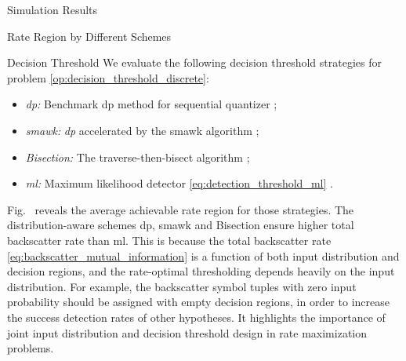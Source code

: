 \begin{section}{Simulation Results}
\begin{subsection}{Rate Region by Different Schemes}
		\begin{subsubsection}{Decision Threshold}
			We evaluate the following decision threshold strategies for problem \eqref{op:decision_threshold_discrete}:
			\begin{itemize}
				\item \emph{\gls{dp}:} Benchmark \gls{dp} method for sequential quantizer \cite{He2021};
				\item \emph{\gls{smawk}:} \emph{\gls{dp}} accelerated by the \gls{smawk} algorithm \cite{He2021};
				\item \emph{Bisection:} The traverse-then-bisect algorithm \cite{Nguyen2020a};
				\item \emph{\gls{ml}:} Maximum likelihood detector \eqref{eq:detection_threshold_ml} \cite{Qian2019}.
			\end{itemize}

			Fig.~ reveals the average achievable rate region for those strategies.
			The distribution-aware schemes \gls{dp}, \gls{smawk} and Bisection ensure higher total backscatter rate than \gls{ml}.
			This is because the total backscatter rate \eqref{eq:backscatter_mutual_information} is a function of both input distribution and decision regions, and the rate-optimal thresholding depends heavily on the input distribution.
			For example, the backscatter symbol tuples with zero input probability should be assigned with empty decision regions, in order to increase the success detection rates of other hypotheses.
			It highlights the importance of joint input distribution and decision threshold design in rate maximization problems.
		\end{subsubsection}

	\end{subsection}



\end{section}
